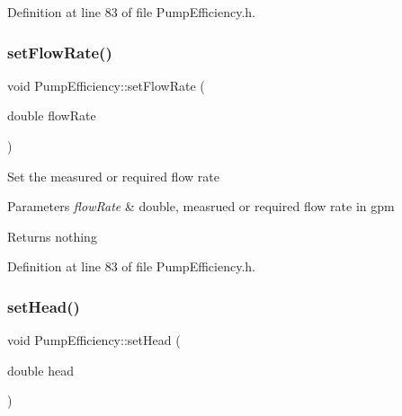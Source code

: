 Definition at line 83 of file Pump\+Efficiency.\+h.

\mbox{\label{class_pump_efficiency_aad051c44f6bdbc6108f2c40450c9d510}} 
\subsubsection{\texorpdfstring{set\+Flow\+Rate()}{setFlowRate()}\hspace{0.1cm}{\footnotesize\ttfamily [3/3]}}
{\footnotesize\ttfamily void Pump\+Efficiency\+::set\+Flow\+Rate (\begin{DoxyParamCaption}\item[{double}]{flow\+Rate }\end{DoxyParamCaption})\hspace{0.3cm}{\ttfamily [inline]}}

Set the measured or required flow rate


\begin{DoxyParams}{Parameters}
{\em flow\+Rate} & double, measrued or required flow rate in gpm\\
\hline
\end{DoxyParams}
\begin{DoxyReturn}{Returns}
nothing 
\end{DoxyReturn}


Definition at line 83 of file Pump\+Efficiency.\+h.

\mbox{\label{class_pump_efficiency_addfa92d7c30598ecedcee8f7c47eed29}} 
\subsubsection{\texorpdfstring{set\+Head()}{setHead()}\hspace{0.1cm}{\footnotesize\ttfamily [1/3]}}
{\footnotesize\ttfamily void Pump\+Efficiency\+::set\+Head (\begin{DoxyParamCaption}\item[{double}]{head }\end{DoxyParamCaption})\hspace{0.3cm}{\ttfamily [inline]}}

